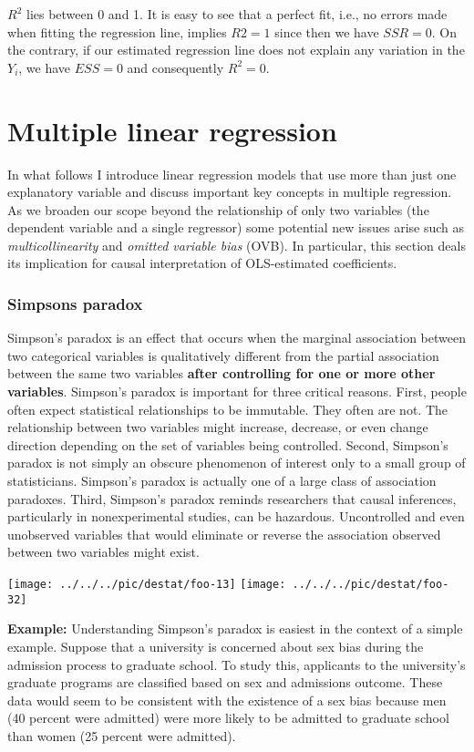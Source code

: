 $R^2$ lies between 0 and 1. It is easy to see that a perfect fit, i.e., no errors made when fitting the regression line, implies $R2=1$ since then we have $SSR=0$. On the contrary, if our estimated regression line does not explain any variation in the $Y_i$, we have $ESS=0$ and consequently $R^2=0$.
%

\section{Multiple linear regression}

In what follows I introduce linear regression models that use more than just one explanatory variable and discuss important key concepts in multiple regression. As we broaden our scope beyond the relationship of only two variables (the dependent variable and a single regressor) some potential new issues arise such as \textit{multicollinearity} and \textit{omitted variable bias} (OVB). In particular, this section deals its implication for causal interpretation of OLS-estimated coefficients.

\subsubsection*{Simpsons paradox}
Simpson's paradox is an effect that occurs when the marginal association between two categorical variables is qualitatively different from the partial association between the same two variables \textbf{after controlling for one or more other variables}. Simpson's paradox is important for three critical reasons. First, people often expect statistical relationships to be immutable. They often are not. The relationship between two variables might increase, decrease, or even change direction depending on the set of variables being controlled. Second, Simpson’s paradox is not simply an obscure phenomenon of interest only to a small group of statisticians. Simpson’s paradox is actually one of a large class of association paradoxes. Third, Simpson’s paradox reminds researchers that causal inferences, particularly in nonexperimental studies, can be hazardous. Uncontrolled and even unobserved variables that would eliminate or reverse the association observed between two variables might exist.


\texttt{[image: ../../../pic/destat/foo-13]}
\texttt{[image: ../../../pic/destat/foo-32]}

\textbf{Example:} Understanding Simpson’s paradox is easiest in the context of a simple example. Suppose that a university is concerned about sex bias during the admission process to graduate school. To study this, applicants to the university’s graduate programs are classified based on sex and admissions outcome. These data would seem to be consistent with the existence of a sex bias because men (40 percent were admitted) were more likely to be admitted to graduate school than women (25 percent were admitted).

